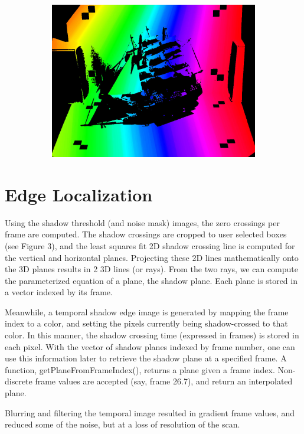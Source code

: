 \documentclass[10pt]{article}
\begin{document}
\begin{figure}[h!]
\begin{subfigure}[b]{0.32\linewidth}
            \includegraphics[width=\linewidth]{schooner/temporalImg.jpg}
    \end{subfigure}


        \caption{}\label{}
\end{figure}

\section{Edge Localization}
Using the shadow threshold (and noise mask) images, the zero crossings per frame are computed. The shadow crossings are cropped to user selected boxes (see Figure 3), and the least squares fit 2D shadow crossing line is computed for the vertical and horizontal planes. Projecting these 2D lines mathematically onto the 3D planes results in 2 3D lines (or rays). From the two rays, we can compute the parameterized equation of a plane, the shadow plane. Each plane is stored in a vector indexed by its frame.

Meanwhile, a temporal shadow edge image is generated by mapping the frame index to a color, and setting the pixels currently being shadow-crossed to that color. In this manner, the shadow crossing time (expressed in frames) is stored in each pixel. With the vector of shadow planes indexed by frame number, one can use this information later to retrieve the shadow plane at a specified frame. A function, getPlaneFromFrameIndex(), returns a plane given a frame index. Non-discrete frame values are accepted (say, frame 26.7), and return an interpolated plane.

Blurring and filtering the temporal image resulted in gradient frame values, and reduced some of the noise, but at a loss of resolution of the scan.
\end{document}
